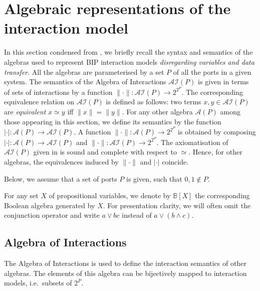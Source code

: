 \documentclass{llncs}
\newcommand{\cA}{\ensuremath{\mathcal{A}}}
\newcommand{\sB}{\ensuremath{\mathbb{B}}}
\newcommand{\ie}[1][\ ]{i.e.#1}
\newcommand{\intsem}[1]{\ensuremath{\|{#1}\|}}
\newcommand{\aisem}[1]{\ensuremath{|{#1}|}}
\newcommand{\ai}{\ensuremath{\mathcal{AI}}}
\begin{document}

\section{Algebraic representations of the interaction model}
\label{secn:algebras}

In this section condensed from
\cite[Section~4]{BarBliu15-offer-scico}, we briefly recall the syntax
and semantics of the algebras used to represent BIP interaction models
\emph{disregarding variables and data transfer}.  All the algebras are
parameterised by a set $P$ of all the ports in a given system.  The
semantics of the Algebra of Interactions $\ai(P)$ is given in terms of
sets of interactions by a function $\intsem{\cdot}: \ai(P) \rightarrow
2^{2^P}$.  The corresponding equivalence relation on $\ai(P)$ is
defined as follows: two terms $x,y \in \ai(P)$ are {\em equivalent} $x
\simeq y$ iff $\intsem{x} = \intsem{y}$.  For any other algebra
$\cA(P)$ among those appearing in this section, we define its
semantics by the function $\aisem{\cdot}: \cA(P) \rightarrow \ai(P)$.
A function $\intsem{\cdot}: \cA(P) \rightarrow 2^{2^P}$ is obtained by
composing $\aisem{\cdot}: \cA(P) \rightarrow \ai(P)$ and
$\intsem{\cdot}: \ai(P) \rightarrow 2^{2^P}$.  The axiomatisation of
$\ai(P)$ given in \cite{BliSif07-acp-emsoft} is sound and complete
with respect to $\simeq$.  Hence, for other algebras, the equivalences
induced by $\intsem{\cdot}$ and $\aisem{\cdot}$ coincide.

Below, we assume that a set of ports $P$ is given, such that $0,1\not\in
P$.

For any set $X$ of propositional variables, we denote by $\sB[X]$ the
corresponding Boolean algebra generated by $X$.  For presentation
clarity, we will often omit the conjunction operator and write $a \lor
bc$ instead of $a \lor (b \land c)$.



\subsection{Algebra of Interactions}
\label{secn:ai}

The Algebra of Interactions is used to define the interaction semantics of other algebras. The elements of this algebra can be bijectively mapped to interaction models, \ie subsets of $2^P$.
\end{document}
